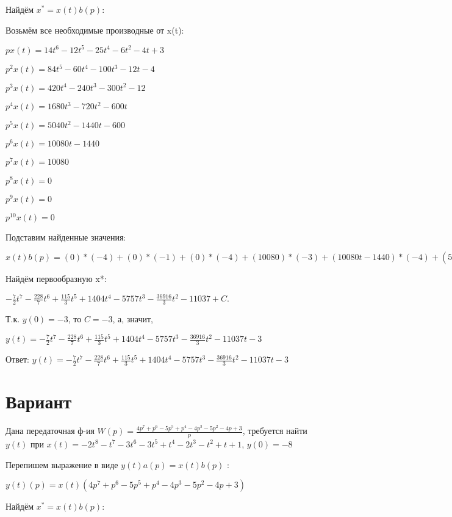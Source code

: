\documentclass{article}
\begin{document}
{{{{{Найдём $x^*=x(t)b(p)$:

Возьмём все необходимые производные от x(t):

$px(t)=14t^{6}-12t^{5}-25t^{4}-6t^{2}-4t+3$

$p^2x(t)=84t^{5}-60t^{4}-100t^{3}-12t-4$

$p^3x(t)=420t^{4}-240t^{3}-300t^{2}-12$

$p^4x(t)=1680t^{3}-720t^{2}-600t$

$p^5x(t)=5040t^{2}-1440t-600$

$p^6x(t)=10080t-1440$

$p^7x(t)=10080$

$p^8x(t)=0$

$p^9x(t)=0$

$p^10x(t)=0$

Подставим найденные значения:

$x(t)b(p) = (0)*(-4)+(0)*(-1)+(0)*(-4)+(10080)*(-3)+(10080t-1440)*(-4)+(5040t^{2}-1440t-600)*(-4)+(1680t^{3}-720t^{2}-600t)*4+(84t^{5}-60t^{4}-100t^{3}-12t-4)*(-3)+(14t^{6}-12t^{5}-25t^{4}-6t^{2}-4t+3)*(-5)+(14t^{6}-12t^{5}-25t^{4}-6t^{2}-4t+3)*3=-28t^{6}-228t^{5}+230t^{4}+7020t^{3}-23028t^{2}-36916t$





Найдём первообразную x*:

$-\frac{7}{2}t^{7}-\frac{228}{7}t^{6}+\frac{115}{3}t^{5}+1404t^{4}-5757t^{3}-\frac{36916}{3}t^{2}-11037+C.$

Т.к. $y(0)=-3$, то $C=-3$, а, значит, 

$y(t)=-\frac{7}{2}t^{7}-\frac{228}{7}t^{6}+\frac{115}{3}t^{5}+1404t^{4}-5757t^{3}-\frac{36916}{3}t^{2}-11037t-3$

Ответ: $y(t) = -\frac{7}{2}t^{7}-\frac{228}{7}t^{6}+\frac{115}{3}t^{5}+1404t^{4}-5757t^{3}-\frac{36916}{3}t^{2}-11037t-3$

\section{Вариант}

Дана передаточная ф-ия $W(p)=\frac{4p^{7}+p^{6}-5p^{5}+p^{4}-4p^{3}-5p^{2}-4p+3}{p}$, требуется найти $y(t)$ при $x(t)=-2t^{8}-t^{7}-3t^{6}-3t^{5}+t^{4}-2t^{3}-t^{2}+t+1$, $y(0)=-8$

Перепишем выражение в виде $y(t)a(p)=x(t)b(p)$ :

$y(t)(p)=x(t)(4p^{7}+p^{6}-5p^{5}+p^{4}-4p^{3}-5p^{2}-4p+3)$

Найдём $x^*=x(t)b(p)$:

}}}}}
\end{document}
